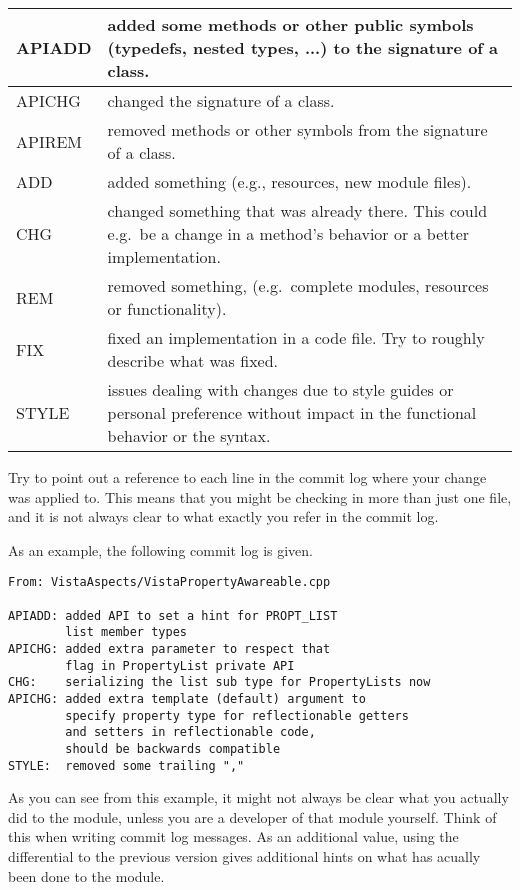 \begin{tabular}{|l|p{12cm}|}\hline
APIADD   & added some methods or other public symbols (typedefs, nested types, ...) to the signature of a class.\\\hline
APICHG   & changed the signature of a class.\\\hline
APIREM   & removed methods or other symbols from the signature of a class.\\\hline
ADD      & added something (e.g., resources, new module files).\\\hline
CHG      & changed something that was already there.
           This could e.g.\ be a change in a method's behavior or a better implementation.\\\hline
REM      & removed something, (e.g.\ complete modules, resources or functionality).\\\hline
FIX      & fixed an implementation in a code file.
           Try to roughly describe what was fixed.\\\hline
STYLE    & issues dealing with changes due to style guides or personal preference without impact in the functional behavior or the syntax.\\\hline
\end{tabular}

Try to point out a reference to each line in the commit log where your change was applied to.
This means that you might be checking in more than just one file, and it is not always clear to what exactly you refer in the commit log.

As an example, the following commit log is given.
\begin{verbatim}
From: VistaAspects/VistaPropertyAwareable.cpp

APIADD: added API to set a hint for PROPT_LIST 
        list member types
APICHG: added extra parameter to respect that 
        flag in PropertyList private API
CHG:    serializing the list sub type for PropertyLists now
APICHG: added extra template (default) argument to 
        specify property type for reflectionable getters 
        and setters in reflectionable code, 
        should be backwards compatible
STYLE:  removed some trailing ","
\end{verbatim}

As you can see from this example, it might not always be clear what you actually did to the module, unless you are a developer of that module yourself.
Think of this when writing commit log messages.
As an additional value, using the differential to the previous version gives additional hints on what has acually been done to the module.


